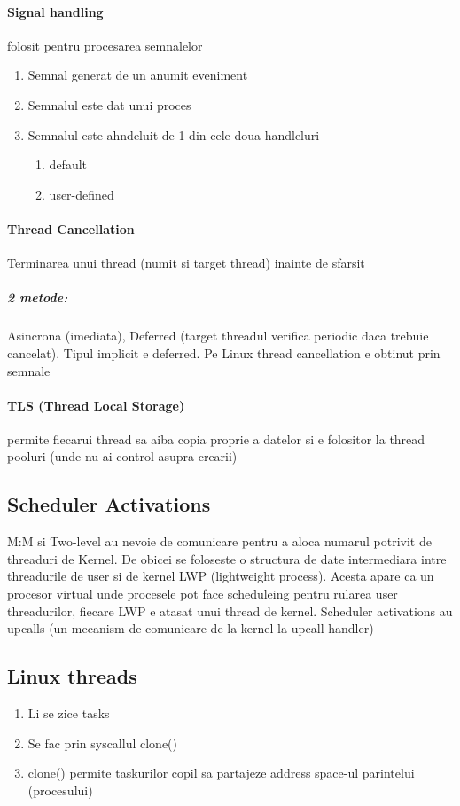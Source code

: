 \documentclass{article}
\begin{document}
\paragraph*{Signal handling} folosit pentru procesarea semnalelor
\begin{enumerate}
    \item Semnal generat de un anumit eveniment
    \item Semnalul este dat unui proces
    \item Semnalul este ahndeluit de 1 din cele doua handleluri
          \begin{enumerate}
              \item default
              \item user-defined
          \end{enumerate}
\end{enumerate}

\paragraph*{Thread Cancellation} Terminarea unui thread (numit si target thread) inainte de sfarsit
\subparagraph*{2 metode:} Asincrona (imediata), Deferred (target threadul verifica periodic daca trebuie cancelat). Tipul implicit e deferred. Pe Linux thread cancellation e obtinut prin semnale

\paragraph*{TLS (Thread Local Storage)} permite fiecarui thread sa aiba copia proprie a datelor si e folositor la thread pooluri (unde nu ai control asupra crearii)

\subsection*{Scheduler Activations}
M:M si Two-level au nevoie de comunicare pentru a aloca numarul potrivit de threaduri de Kernel. De obicei se foloseste o structura de date intermediara intre threadurile de user si de kernel LWP (lightweight process). Acesta apare ca un procesor virtual unde procesele pot face scheduleing pentru rularea user threadurilor, fiecare LWP e atasat unui thread de kernel. Scheduler activations au upcalls (un mecanism de comunicare de la kernel la upcall handler)

\subsection*{Linux threads}
\begin{enumerate}
    \item Li se zice tasks
    \item Se fac prin syscallul clone()
    \item clone() permite taskurilor copil sa partajeze address space-ul parintelui (procesului)
\end{enumerate}
\end{document}
